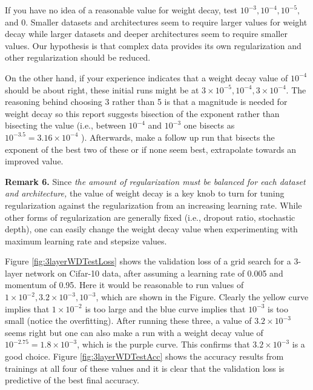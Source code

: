 \documentclass{article} %
\begin{document}
If you have no idea of a reasonable value for weight decay, test $ 10^{-3},  10^{-4},  10^{-5},$ and 0. Smaller datasets and architectures seem to require larger values for weight decay while larger datasets and deeper architectures seem to require smaller values.  Our hypothesis is that complex data provides its own regularization and other regularization should be reduced.    

On the other hand, if your experience indicates that a weight decay value of $10^{-4}$ should be about right, these initial runs might be at $3 \times 10^{-5},  10^{-4}, 3 \times 10^{-4}$.  The reasoning behind choosing 3 rather than 5 is that a magnitude is needed for weight decay so this report suggests bisection of the exponent rather than bisecting the value (i.e., between $10^{-4}$ and $10^{-3}$ one bisects as $ 10^{-3.5} = 3.16 \times 10^{-4}$ ). Afterwards, make a follow up run that bisects the exponent of the best two of these or if none seem best, extrapolate towards an improved value.

\textbf{Remark 6.}
Since  \emph{the amount of regularization must be balanced for each dataset and architecture,} the value of weight decay is a key knob to turn for tuning regularization against the regularization from an increasing learning rate.  While other forms of regularization are generally fixed (i.e., dropout ratio, stochastic depth), one can easily change the weight decay value when experimenting with maximum learning rate and stepsize values.

Figure \ref{fig:3layerWDTestLoss} shows the validation loss of a grid search for a 3-layer network on Cifar-10 data, after assuming a learning rate of 0.005 and momentum of 0.95.  Here it would be reasonable to run values of $1 \times 10^{-2}, 3.2 \times  10^{-3}, 10^{-3}$, which are shown in the Figure.  Clearly the yellow curve implies that $1 \times 10^{-2} $ is too large and the blue curve implies that $10^{-3}$ is too small (notice the overfitting).  After running these three, a value of $ 3.2 \times  10^{-3}$ seems right but one can also make a run with a weight decay value of  $10^{-2.75} = 1.8 \times  10^{-3}$, which is the purple curve.  This confirms  that $ 3.2 \times  10^{-3}$ is a good choice.   Figure \ref{fig:3layerWDTestAcc} shows the accuracy results from trainings at all four of these values and it is clear that the validation loss is predictive of the best final accuracy.
\end{document}
